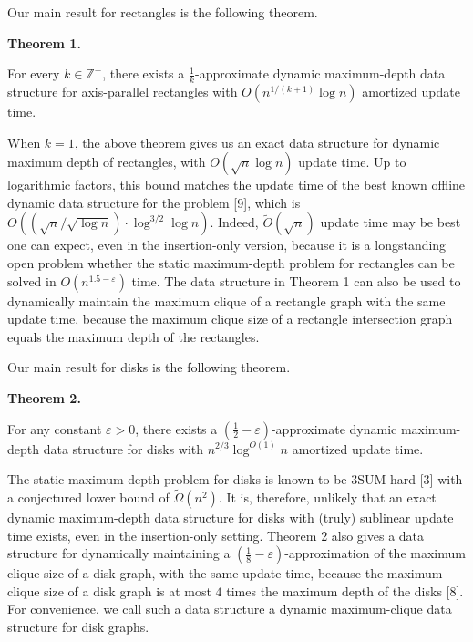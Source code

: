 Our main result for rectangles is the following theorem.
\par
\par
\par\medskip\noindent\textbf{Theorem 1.}\par
For every $k\in\mathbb{Z}^{+}$, there exists a $\frac{1}{k}$-approximate dynamic maximum-depth data structure for axis-parallel rectangles with $O(n^{1/(k+1)}\log n)$ amortized update time.
\par
\par
\par
When $k=1$, the above theorem gives us an exact data structure for dynamic maximum depth of rectangles, with $O(\sqrt{n}\log n)$ update time. Up to logarithmic factors, this bound matches the update time of the best known offline dynamic data structure for the problem [9], which is $O((\sqrt{n}/\sqrt{\log n})\cdot\log^{3/2}\log n)$. Indeed, $\widetilde{O}(\sqrt{n})$ update time may be best one can expect, even in the insertion-only version, because it is a longstanding open problem whether the static maximum-depth problem for rectangles can be solved in $O(n^{1.5-\varepsilon})$ time. The data structure in Theorem 1 can also be used to dynamically maintain the maximum clique of a rectangle graph with the same update time, because the maximum clique size of a rectangle intersection graph equals the maximum depth of the rectangles.
\par
\par
Our main result for disks is the following theorem.
\par
\par
\par\medskip\noindent\textbf{Theorem 2.}\par
For any constant $\varepsilon>0$, there exists a $(\frac{1}{2}-\varepsilon)$-approximate dynamic maximum-depth data structure for disks with $n^{2/3}\log^{O(1)}n$ amortized update time.
\par
\par
\par
The static maximum-depth problem for disks is known to be 3SUM-hard [3] with a conjectured lower bound of $\widetilde{\Omega}(n^{2})$. It is, therefore, unlikely that an exact dynamic maximum-depth data structure for disks with (truly) sublinear update time exists, even in the insertion-only setting. Theorem 2 also gives a data structure for dynamically maintaining a $(\frac{1}{8}-\varepsilon)$-approximation of the maximum clique size of a disk graph, with the same update time, because the maximum clique size of a disk graph is at most $4$ times the maximum depth of the disks [8]. For convenience, we call such a data structure a dynamic maximum-clique data structure for disk graphs.
